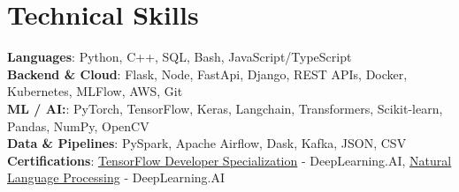\documentclass[letterpaper,8pt]{article}
\begin{document}
\section{Technical Skills}
  \vspace{-1pt}
  \begin{itemize}[leftmargin=0.0in, label={}]
    \small{\item{   
    \textbf{Languages}{: Python, C++, SQL, Bash, JavaScript/TypeScript} \\[1mm]
    \textbf{Backend \& Cloud}{: Flask, Node, FastApi, Django, REST APIs, Docker, Kubernetes, MLFlow, AWS, Git} \\[1mm]
    \textbf{ML / AI:}{: PyTorch, TensorFlow, Keras, Langchain, Transformers, Scikit-learn, Pandas, NumPy, OpenCV} \\ [1mm]
    \textbf{Data \& Pipelines}{: PySpark, Apache Airflow, Dask, Kafka, JSON, CSV} \\ [1mm]
    \textbf{Certifications}{: \href{https://www.coursera.org/account/accomplishments/specialization/certificate/YW8U4922JT6N}{TensorFlow Developer Specialization} - DeepLearning.AI, \href{https://www.coursera.org/account/accomplishments/certificate/PXWY38Y7VJZB}{Natural Language Processing} - DeepLearning.AI } \\ [1mm]
    }}
  \end{itemize}
\vspace{-14pt}

\end{document}
